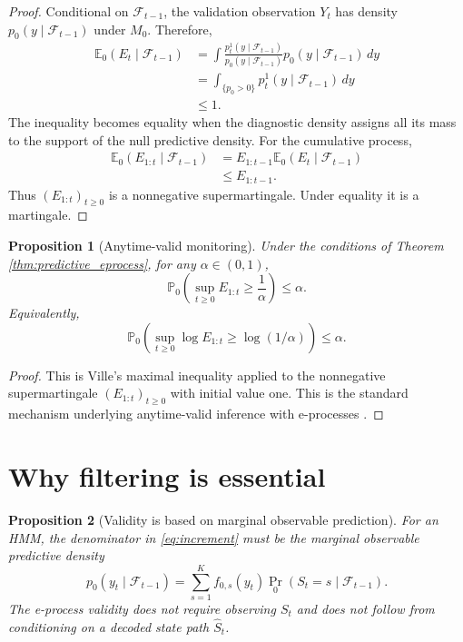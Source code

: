 \documentclass[11pt]{article}
\newtheorem{proposition}{Proposition}
\begin{document}
\begin{proof}
Conditional on $\mathcal F_{t-1}$, the validation observation $Y_t$ has density $p_0(y \mid \mathcal F_{t-1})$ under $M_0$. Therefore,
\begin{align}
\mathbb E_0(E_t \mid \mathcal F_{t-1})
&=
\int
\frac{p_t^1(y \mid \mathcal F_{t-1})}
{p_0(y \mid \mathcal F_{t-1})}
 p_0(y \mid \mathcal F_{t-1})\,dy \\
&=
\int_{\{p_0>0\}} p_t^1(y \mid \mathcal F_{t-1})\,dy \\
&\leq 1.
\end{align}
The inequality becomes equality when the diagnostic density assigns all its mass to the support of the null predictive density. For the cumulative process,
\begin{align}
\mathbb E_0(E_{1:t} \mid \mathcal F_{t-1})
&=
E_{1:t-1}\mathbb E_0(E_t \mid \mathcal F_{t-1}) \\
&\leq E_{1:t-1}.
\end{align}
Thus $(E_{1:t})_{t\geq0}$ is a nonnegative supermartingale. Under equality it is a martingale.
\end{proof}

\begin{proposition}[Anytime-valid monitoring]
\label{prop:anytime}
Under the conditions of Theorem \ref{thm:predictive_eprocess}, for any $\alpha \in (0,1)$,
\begin{equation}
\mathbb P_0\left(\sup_{t\geq0} E_{1:t} \geq \frac{1}{\alpha}\right) \leq \alpha.
\end{equation}
Equivalently,
\begin{equation}
\mathbb P_0\left(\sup_{t\geq0} \log E_{1:t} \geq \log(1/\alpha)\right) \leq \alpha.
\end{equation}
\end{proposition}

\begin{proof}
This is Ville's maximal inequality applied to the nonnegative supermartingale $(E_{1:t})_{t\geq0}$ with initial value one. This is the standard mechanism underlying anytime-valid inference with e-processes \citep{howard_2020_time_uniform}.
\end{proof}

\section{Why filtering is essential}

\begin{proposition}[Validity is based on marginal observable prediction]
\label{prop:latent_filtering}
For an HMM, the denominator in \eqref{eq:increment} must be the marginal observable predictive density
\begin{equation}
p_0(y_t \mid \mathcal F_{t-1})
=
\sum_{s=1}^K f_{0,s}(y_t)\Pr_0(S_t=s \mid \mathcal F_{t-1}).
\end{equation}
The e-process validity does not require observing $S_t$ and does not follow from conditioning on a decoded state path $\widehat S_t$.
\end{proposition}
\end{document}
